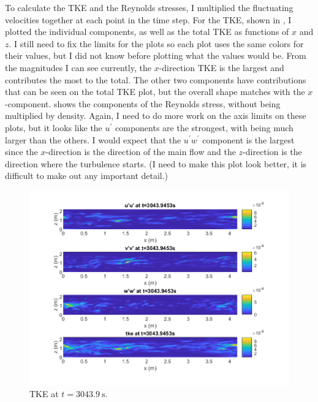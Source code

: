 \documentclass[11pt]{article}
\begin{document}
\begin{enumerate}
\begin{enumerate}
			To calculate the TKE and the Reynolds stresses, I multiplied the fluctuating velocities together at each point in the time step. For the TKE, shown in , I plotted the individual components, as well as the total TKE as functions of $x$ and $z$. I still need to fix the limits for the plots so each plot uses the same colors for their values, but I did not know before plotting what the values would be. From the magnitudes I can see currently, the $x$-direction TKE is the largest and contributes the most to the total. The other two components have contributions that can be seen on the total TKE plot, but the overall shape matches with the $x$-component.  shows the components of the Reynolds stress, without being multiplied by density. Again, I need to do more work on the axis limits on these plots, but it looks like the $u^{\prime}$ components are the strongest, with being much larger than the others. I would expect that the $u^{\prime}w^{\prime}$ component is the largest since the $x$-direction is the direction of the main flow and the $z$-direction is the direction where the turbulence starts. (I need to make this plot look better, it is difficult to make out any important detail.)
			
			\begin{figure}[htpb]
				\centering
				\includegraphics[width=\textwidth]{1-plots/tke_plot_3043.png}
				\caption{TKE at $t=\SI{3043.9}{\second}$.}
				\label{fig:tke 3043}
			\end{figure}
		

\end{enumerate}
\end{enumerate}
\end{document}
